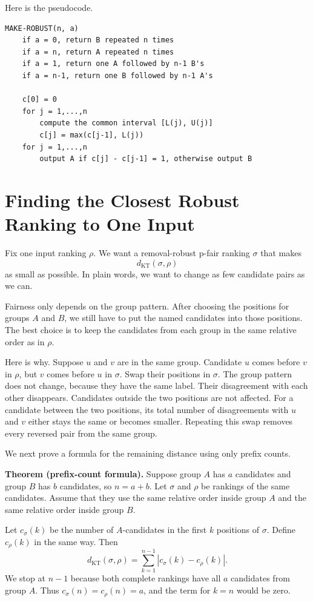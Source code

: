 \documentclass[11pt]{article}
\newcommand{\KT}{d_{\mathrm{KT}}}
\begin{document}
Here is the pseudocode.

\begin{verbatim}
MAKE-ROBUST(n, a)
    if a = 0, return B repeated n times
    if a = n, return A repeated n times
    if a = 1, return one A followed by n-1 B's
    if a = n-1, return one B followed by n-1 A's

    c[0] = 0
    for j = 1,...,n
        compute the common interval [L(j), U(j)]
        c[j] = max(c[j-1], L(j))
    for j = 1,...,n
        output A if c[j] - c[j-1] = 1, otherwise output B
\end{verbatim}

\section{Finding the Closest Robust Ranking to One Input}

Fix one input ranking $\rho$.  We want a removal-robust p-fair ranking
$\sigma$ that makes
\[
 \KT(\sigma,\rho)
\]
as small as possible.  In plain words, we want to change as few candidate
pairs as we can.

Fairness only depends on the group pattern.  After choosing the positions for
groups $A$ and $B$, we still have to put the named candidates into those
positions.  The best choice is to keep the candidates from each group in the
same relative order as in $\rho$.

Here is why.  Suppose $u$ and $v$ are in the same group.  Candidate $u$ comes
before $v$ in $\rho$, but $v$ comes before $u$ in $\sigma$.  Swap their
positions in $\sigma$.  The group pattern does not change, because they have
the same label.  Their disagreement with each other disappears.  Candidates
outside the two positions are not affected.  For a candidate between the two
positions, its total number of disagreements with $u$ and $v$ either stays the
same or becomes smaller.  Repeating this swap removes every reversed pair
from the same group.

We next prove a formula for the remaining distance using only prefix counts.

\medskip
\noindent\textbf{Theorem (prefix-count formula).}
Suppose group $A$ has $a$ candidates and group $B$ has $b$ candidates, so
$n=a+b$.  Let $\sigma$ and $\rho$ be rankings of the same candidates.  Assume
that they use the same relative order inside group $A$ and the same relative
order inside group $B$.

Let $c_\sigma(k)$ be the number of $A$-candidates in the first $k$ positions
of $\sigma$.  Define $c_\rho(k)$ in the same way.  Then
\[
  \KT(\sigma,\rho)
  =\sum_{k=1}^{n-1}\left|c_\sigma(k)-c_\rho(k)\right|.
\]
We stop at $n-1$ because both complete rankings have all $a$ candidates from
group $A$.  Thus $c_\sigma(n)=c_\rho(n)=a$, and the term for $k=n$ would be
zero.
\medskip
\end{document}
